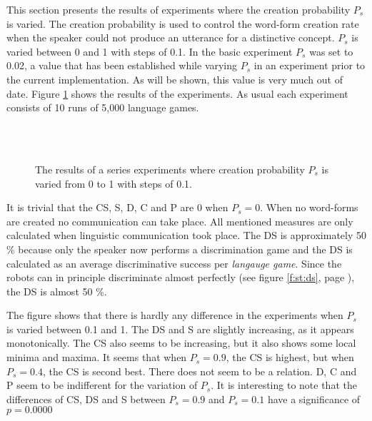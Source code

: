 This section presents the results of experiments where the creation probability $P_s$ is varied. The creation probability is used to control the word-form creation rate when the speaker could not produce an utterance for a distinctive concept. $P_s$ is varied between 0 and 1 with steps of 0.1. In the basic experiment $P_s$ was set to 0.02, a value that has been established while varying $P_s$ in an experiment prior to the current implementation. As will be shown, this value is very much out of date. Figure \ref{f:lex:p} shows the results of the experiments. As usual each experiment consists of 10 runs of 5,000 language games. 

\begin{figure}
\\
\\
\caption{The results of a series experiments where creation probability $P_s$ is varied from 0 to 1 with steps of 0.1.}
\label{f:lex:p}
\end{figure}

\p
It is trivial that the CS, S, D, C and P are 0 when $P_s=0$. When no word-forms are created no communication can take place. All mentioned measures are only calculated when linguistic communication took place. The DS is approximately 50 \% because only the speaker now performs a discrimination game and the DS is calculated as an average discriminative success per {\em langauge game}. Since the robots can in principle discriminate almost perfectly (see figure \ref{f:st:ds}, page \pageref{f:st:ds}), the DS is almost 50 \%. 

The figure shows that there is hardly any difference in the experiments when $P_s$ is varied between 0.1 and 1. The DS and S are slightly increasing, as it appears monotonically. The CS also seems to be increasing, but it also shows some local minima and maxima. It seems that when $P_s=0.9$, the CS is highest, but when $P_s=0.4$, the CS is second best. There does not seem to be a relation. D, C and P seem to be indifferent for the variation of $P_s$. It is interesting to note that the differences of CS, DS and S between $P_s=0.9$ and $P_s=0.1$ have a significance of $p=0.0000$

